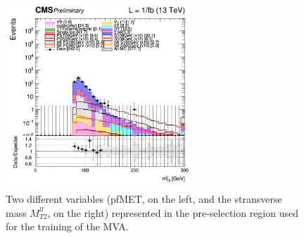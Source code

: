 \documentclass[a4paper, 10pt, openright]{report}
\begin{document}
\begin{figure}[htbp]
{\begin{minipage}[b]{.48\textwidth}
\end{minipage}\hfill
\begin{minipage}[b]{.48\textwidth}
\includegraphics[width=7cm, height=7cm]{figs/log_cratio_topCR_ll_mt2ll_2017.png}
\end{minipage} \hfill
}
\caption{Two different variables (pf\ac{MET}, on the left, and the stransverse mass $M_{T2}^{ll}$, on the right) represented in the pre-selection region used for the training of the \ac{MVA}.}
\label{fig:preSelSR}
\end{figure}
\end{document}
